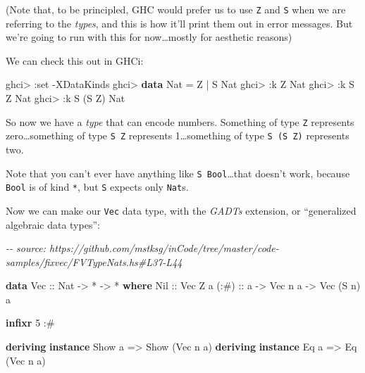 \documentclass[]{article}
\newenvironment{Shaded}{}{}
\newcommand{\CommentTok}[1]{\textcolor[rgb]{0.38,0.63,0.69}{\textit{#1}}}
\newcommand{\DataTypeTok}[1]{\textcolor[rgb]{0.56,0.13,0.00}{#1}}
\newcommand{\DecValTok}[1]{\textcolor[rgb]{0.25,0.63,0.44}{#1}}
\newcommand{\KeywordTok}[1]{\textcolor[rgb]{0.00,0.44,0.13}{\textbf{#1}}}
\newcommand{\NormalTok}[1]{#1}
\newcommand{\OperatorTok}[1]{\textcolor[rgb]{0.40,0.40,0.40}{#1}}
\newcommand{\OtherTok}[1]{\textcolor[rgb]{0.00,0.44,0.13}{#1}}
\begin{document}
(Note that, to be principled, GHC would prefer us to use
\texttt{\textquotesingle{}Z} and \texttt{\textquotesingle{}S} when we are
referring to the \emph{types}, and this is how it'll print them out in error
messages. But we're going to run with this for now\ldots mostly for aesthetic
reasons)

We can check this out in GHCi:

\begin{Shaded}
\begin{Highlighting}[]
\NormalTok{ghci}\OperatorTok{>} \OperatorTok{:}\NormalTok{set }\OperatorTok{{-}}\DataTypeTok{XDataKinds}
\NormalTok{ghci}\OperatorTok{>} \KeywordTok{data} \DataTypeTok{Nat} \OtherTok{=} \DataTypeTok{Z} \OperatorTok{|} \DataTypeTok{S} \DataTypeTok{Nat}
\NormalTok{ghci}\OperatorTok{>} \OperatorTok{:}\NormalTok{k }\DataTypeTok{Z}
\DataTypeTok{Nat}
\NormalTok{ghci}\OperatorTok{>} \OperatorTok{:}\NormalTok{k }\DataTypeTok{S} \DataTypeTok{Z}
\DataTypeTok{Nat}
\NormalTok{ghci}\OperatorTok{>} \OperatorTok{:}\NormalTok{k }\DataTypeTok{S}\NormalTok{ (}\DataTypeTok{S} \DataTypeTok{Z}\NormalTok{)}
\DataTypeTok{Nat}
\end{Highlighting}
\end{Shaded}

So now we have a \emph{type} that can encode numbers. Something of type
\texttt{Z} represents zero\ldots something of type \texttt{S\ Z} represents
1\ldots something of type \texttt{S\ (S\ Z)} represents two.

Note that you can't ever have anything like \texttt{S\ Bool}\ldots that doesn't
work, because \texttt{Bool} is of kind \texttt{*}, but \texttt{S} expects only
\texttt{Nat}s.

Now we can make our \texttt{Vec} data type, with the \emph{GADTs} extension, or
``generalized algebraic data types'':

\begin{Shaded}
\begin{Highlighting}[]
\CommentTok{{-}{-} source: https://github.com/mstksg/inCode/tree/master/code{-}samples/fixvec/FVTypeNats.hs\#L37{-}L44}

\KeywordTok{data} \DataTypeTok{Vec}\OtherTok{ ::} \DataTypeTok{Nat} \OtherTok{{-}>} \OperatorTok{*} \OtherTok{{-}>} \OperatorTok{*} \KeywordTok{where}
    \DataTypeTok{Nil}\OtherTok{  ::} \DataTypeTok{Vec} \DataTypeTok{Z}\NormalTok{ a}
\OtherTok{    (:\#) ::}\NormalTok{ a }\OtherTok{{-}>} \DataTypeTok{Vec}\NormalTok{ n a }\OtherTok{{-}>} \DataTypeTok{Vec}\NormalTok{ (}\DataTypeTok{S}\NormalTok{ n) a}

\KeywordTok{infixr} \DecValTok{5} \OperatorTok{:\#}

\KeywordTok{deriving} \KeywordTok{instance} \DataTypeTok{Show}\NormalTok{ a }\OtherTok{=>} \DataTypeTok{Show}\NormalTok{ (}\DataTypeTok{Vec}\NormalTok{ n a)}
\KeywordTok{deriving} \KeywordTok{instance} \DataTypeTok{Eq}\NormalTok{ a }\OtherTok{=>} \DataTypeTok{Eq}\NormalTok{ (}\DataTypeTok{Vec}\NormalTok{ n a)}
\end{Highlighting}
\end{Shaded}
\end{document}
